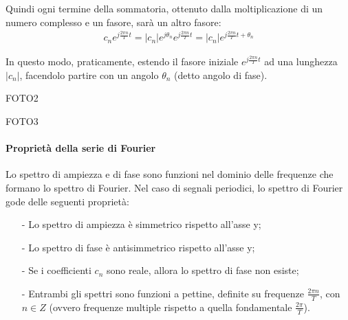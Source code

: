 \documentclass[a4paper, 10pt]{report}
\begin{document}
\noindent Quindi ogni termine della sommatoria, ottenuto dalla moltiplicazione di un numero complesso e un fasore, sarà un altro fasore:
\begin{align*}
c_ne^{j\frac{2 \pi n}{T} t} = |c_n|e^{j\theta_n}e^{j\frac{2 \pi n}{T} t} = |c_n|e^{j\frac{2 \pi n}{T} t + \theta_n}
\end{align*}

\noindent In questo modo, praticamente, estendo il fasore iniziale $e^{j\frac{2 \pi n}{T} t}$ ad una lunghezza $|c_n|$, facendolo partire con un angolo $\theta_n$ (detto angolo di fase). 
\begin{center}
FOTO2

FOTO3
\end{center}

\begin{tcolorbox}[title=\textbf{Caso coefficiente reale}]

\end{tcolorbox}

\paragraph*{Proprietà della serie di Fourier} Lo spettro di ampiezza e di fase sono funzioni nel dominio delle frequenze che formano lo spettro di Fourier. Nel caso di segnali periodici, lo spettro di Fourier gode delle seguenti proprietà:
\begin{itemize}
\item[-] Lo spettro di ampiezza è simmetrico rispetto all'asse y;
\item[-] Lo spettro di fase è antisimmetrico rispetto all'asse y;
\item[-] Se i coefficienti $c_n$ sono reale, allora lo spettro di fase non esiste;
\item[-] Entrambi gli spettri sono funzioni a pettine, definite su frequenze $\frac{2 \pi  n}{T}$, con $n \in Z$ (ovvero frequenze multiple rispetto a quella fondamentale $\frac{2 \pi}{T}$).
\end{itemize}
\end{document}

